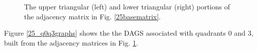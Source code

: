 \begin{figure}[H]
\begin{minipage}[c]{0.5\textwidth}
\centering
{}
\end{minipage}
\begin{minipage}[c]{0.5\textwidth}
\centering
{}
\end{minipage}
\caption{The upper triangular (left) and lower triangular (right) portions of the adjacency matrix in Fig. \ref{25basematrix}.}
\label{25baseportionmatrices}
\end{figure}
Figure \ref{25_q0q3graphs} shows the the DAGS associated with quadrants 0 and 3, built from the adjacency matrices in Fig. \ref{25baseportionmatrices}.
